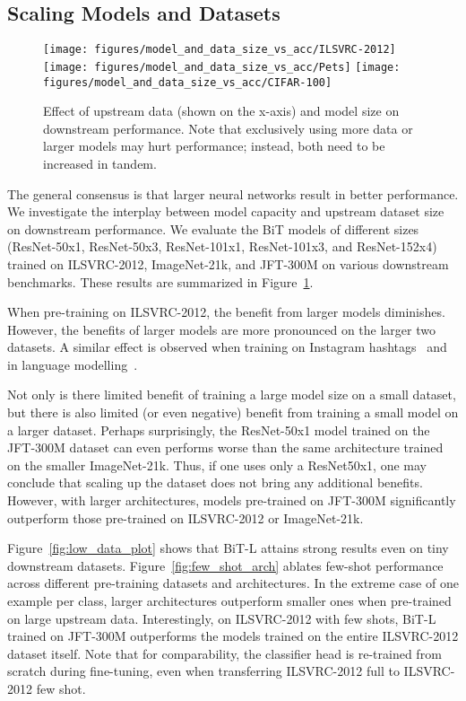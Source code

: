 \documentclass[runningheads]{llncs}
\newcommand{\name}{{BiT}}
\newcommand{\imagenet}{{ILSVRC-2012}}
\begin{document}
\subsection{Scaling Models and Datasets}
\label{sec:architecture}

\begin{figure}[b]\vspace{-10pt}
\centering
\texttt{[image: figures/model\_and\_data\_size\_vs\_acc/ILSVRC-2012]}
\!\!\!\!\!
\texttt{[image: figures/model\_and\_data\_size\_vs\_acc/Pets]}
\!\!\!\!\!
\texttt{[image: figures/model\_and\_data\_size\_vs\_acc/CIFAR-100]}
\caption{Effect of upstream data (shown on the x-axis) and model size on downstream performance. Note that exclusively using more data or larger models may hurt performance; instead, both need to be increased in tandem.}
\label{fig:size_vs_acc}
\end{figure}

The general consensus is that larger neural networks result in better performance.
We investigate the interplay between model capacity and upstream dataset size on downstream performance.
We evaluate the \name{} models of different sizes (ResNet-50x1, ResNet-50x3, ResNet-101x1, ResNet-101x3, and ResNet-152x4) trained on \imagenet{}, ImageNet-21k, and JFT-300M on various downstream benchmarks.
These results are summarized in Figure~\ref{fig:size_vs_acc}.

When pre-training on \imagenet{}, the benefit from larger models diminishes.
However, the benefits of larger models are more pronounced on the larger two datasets.
A similar effect is observed when training on Instagram hashtags~\cite{mahajan2018exploring} and in language modelling~\cite{kaplan2020scaling}.

Not only is there limited benefit of training a large model size on a small dataset, but there is also limited (or even negative) benefit from training a small model on a larger dataset. 
Perhaps surprisingly, the ResNet-50x1 model trained on the JFT-300M dataset can even performs worse than the same architecture trained on the smaller ImageNet-21k.
Thus, if one uses only a ResNet50x1, one may conclude that scaling up the dataset does not bring any additional benefits.
However, with larger architectures, models pre-trained on JFT-300M significantly outperform those pre-trained on \imagenet{} or ImageNet-21k.

Figure~\ref{fig:low_data_plot} shows that \name{}-L attains strong results even on tiny downstream datasets.
Figure~\ref{fig:few_shot_arch} ablates few-shot performance across different pre-training datasets and architectures.
In the extreme case of one example per class, larger architectures outperform smaller ones when pre-trained on large upstream data.
Interestingly, on \imagenet{} with few shots, \name{}-L trained on JFT-300M outperforms the models trained on the entire \imagenet{} dataset itself. 
Note that for comparability, the classifier head is re-trained from scratch during fine-tuning, even when transferring \imagenet{} full to \imagenet{} few shot.
\end{document}
